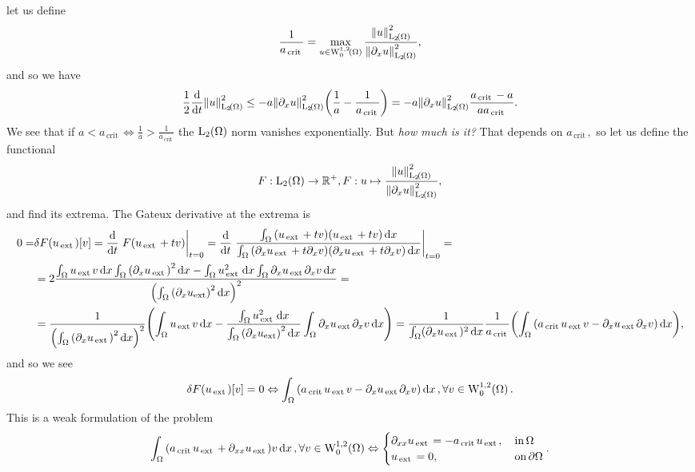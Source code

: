 \documentclass[reqno, a4paper]{article}
\begin{document}
let us define
\[
	\frac{1}{a_{\, \text{crit} \,}} = \max_{u \in \WkpzeroSet[1][2]{\Omega}}\frac{\norm{u}_{\LpSet[2]{\Omega}}^{2}}{\norm{\partial_x u}_{\LpSet[2]{\Omega}}^{2}},
\]
and so we have
\[
	\frac{1}{2}\dv{t}\norm{u}_{\LpSet[2]{\Omega}}^{2} \leq -a \norm{\partial_x u}_{\LpSet[2]{\Omega}}^{2}\qty(\frac{1}{a}-\frac{1}{a_{\, \text{crit} \,}}) = -a \norm{\partial_x u}_{\LpSet[2]{\Omega}}^{2} \frac{a_{\, \text{crit} \,}-a}{a a_{\, \text{crit} \,}}.
\]
We see that if $a < a_{\, \text{crit} \,} \Leftrightarrow \frac{1}{a} > \frac{1}{a_{\, \text{crit} \,}}$ the $\LpSet[2]{\Omega}$ norm vanishes exponentially.
But \textit{how much is it?} That depends on $a_{\, \text{crit} \,},$ so let us define the functional
\[
	F: \LpSet[2]{\Omega} \to \R^+, F: u \mapsto \frac{\norm{u}_{\LpSet[2]{\Omega}}^{2}}{\norm{\partial_x u}_{\LpSet[2]{\Omega}}^{2}},
\]
and find its extrema. The Gateux derivative at the extrema is
\begin{align*}
	0 = &\delta F\qty(u_{\, \text{ext} \,})[v] = \dv{t} \eval{F\qty(u_{\, \text{ext} \,} + t v)}_{t=0} = \dv{t} \eval{\frac{\int_{\Omega}\qty(u_{\, \text{ext} \,}+tv)\qty(u_{\, \text{ext} \,}+tv)\dd{x}}{\int_{\Omega}\qty(\partial_x u_{\, \text{ext} \,}+t \partial_x v)\qty(\partial_x u_{\, \text{ext} \,}+t \partial_xv)\dd{x}}}_{t=0} =\\
	    & = 2\frac{\int_{\Omega}u_{\, \text{ext} \,}v\dd{x}\int_{\Omega}\qty(\partial_x u_{\, \text{ext} \,})^{2}\dd{x} - \int_{\Omega}u_{\, \text{ext} \,}^{2}\dd{x}\int_{\Omega}\partial_x u_{\, \text{ext} \,} \partial_x v\dd{x}}{\qty(\int_{\Omega}\qty(\partial_x u_{\text{ext}})^{2}\dd{x})^{2}} = \\
	    & = \frac{1}{\qty(\int_{\Omega}\qty(\partial_x u_{\, \text{ext} \,})^{2}\dd{x})^{2}}\qty(\int_{\Omega}u_{\, \text{ext} \,}v\dd{x}-\frac{\int_{\Omega}u_{\, \text{ext} \,}^{2}\dd{x}}{\int_{\Omega}\qty(\partial_x u_{\text{ext}})^{2}\dd{x}} \int_{\Omega}\partial_x u_{\, \text{ext} \,} \partial_x v\dd{x}) = \frac{1}{\int_{\Omega} (\partial_x u_{\, \text{ext} \,})^{2}\dd{x}} \frac{1}{a_{\, \text{crit} \,}}\qty(\int_{\Omega}\qty(a_{\, \text{crit} \,}u_{\, \text{ext} \,}v - \partial_x u_{\, \text{ext} \,}\partial_x v)\dd{x}),
\end{align*}
and so we see
\[
	\delta F\qty(u_{\, \text{ext} \,})[v] = 0 \Leftrightarrow \int_{\Omega}\qty(a_{\, \text{crit} \,} u_{\, \text{ext} \,} v - \partial_x u_{\, \text{ext} \,} \partial_x v)\dd{x}, \forall v \in \WkpzeroSet[1][2]{\Omega}.
\]
This is a weak formulation of the problem
\[
	\int_{\Omega}\qty(a_{\, \text{crit} \,} u_{\, \text{ext} \,}+ \partial_{xx}u_{\, \text{ext} \,})v\dd{x}, \forall v \in \WkpzeroSet[1][2]{\Omega} \Leftrightarrow \begin{cases}\partial_{xx}u_{\, \text{ext} \,} = - a_{\, \text{crit} \,}u_{\, \text{ext} \,}, & \, \text{in} \,\Omega \\
		u_{\, \text{ext} \,} = 0,& \, \text{on} \, \partial \Omega 
	\end{cases}.
	\]
\end{document}
